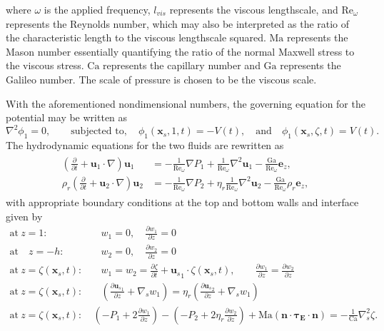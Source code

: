 \documentclass{jfm_arxiv}
\newcommand{\xs}{\mathbf{x}_s}
\newcommand{\us}{\mathbf{u}_s}
\newcommand{\vel}{\mathbf{u}}
\newcommand{\Ma}{\text{Ma}}
\newcommand{\Ca}{\text{Ca}}
\newcommand{\Ga}{\text{Ga}}
\renewcommand{\Re}{\text{Re}_\omega}
\begin{document}
where $\omega$ is the applied frequency, $l_{vis}$ represents the viscous lengthscale, and $\Re$ represents the Reynolds number, which may also be interpreted as the ratio of the characteristic length to the viscous lengthscale squared.
$\Ma$ represents the Mason number essentially quantifying the ratio of the normal Maxwell stress to the viscous stress.
$\Ca$ represents the capillary number and $\Ga$ represents the Galileo number.
The scale of pressure is chosen to be the viscous scale.

With the aforementioned nondimensional numbers, the governing equation for the potential may be written as
\begin{equation}
  \nabla^2\phi_1 = 0, \qquad \text{subjected to},\quad \phi_1(\xs,1,t) = -V(t),\quad \text{and} \quad \phi_1(\xs,\zeta,t) = V(t).
  \label{eq:pot_nd}
  \end{equation}
The hydrodynamic equations for the two fluids are rewritten as
\begin{eqnarray}
  \begin{aligned}
 \left( \frac{\partial }{\partial t} + \vel_1\cdot \nabla \right)\vel_1 &= -\frac{1}{\Re}\nabla P_1 + \frac{1}{\Re}\nabla^2 \vel_1 -\frac{\Ga}{\Re} {\mathbf{e}_z}, \\
 {\rho_r} \left( \frac{\partial }{\partial t} + \vel_2 \cdot \nabla \right)\vel_2 &= -\frac{1}{\Re}\nabla P_2 + \eta_r\frac{1}{\Re}\nabla^2 \vel_2 -\frac{\Ga}{\Re}\rho_r {\mathbf{e}_z},
  \end{aligned}
  \label{eq:hydro}
\end{eqnarray}
with appropriate boundary conditions at the top and bottom walls and interface given by
\begin{align}
  \text{at} \: z = 1: &\quad w_1 = 0, \quad \frac{\partial w_1}{\partial z} = 0
  \label{eq:noslip_top}
  \\
  \text{at} \quad z = -h: &\quad  w_2 = 0, \quad \frac{\partial w_2}{\partial z} = 0
  \label{eq:noslip_bot}
  \\
  \text{at} \: z = \zeta(\xs,t): &\quad  w_1 = w_2 = \frac{\partial \zeta}{\partial t} + {\us}_1\cdot \zeta(\xs,t), \qquad \frac{\partial w_1}{\partial z} = \frac{\partial w_2}{\partial z}
  \label{eq:dyn_bc}
  \\
\text{at} \: z = \zeta(\xs,t): &\quad \left(\frac{\partial {\us}_1}{\partial z} + \nabla_sw_1 \right)
  =\eta_r \left(\frac{\partial {\us}_2}{\partial z} + \nabla_sw_1 \right)
  \label{eq:tang_str}
  \\
  \text{at} \: z = \zeta(\xs,t): &\: \left(-P_1 + 2 \frac{\partial w_1}{\partial z}\right) - \left(-P_2 + 2\eta_r \frac{\partial w_2}{\partial z}\right) + \Ma\left({\mathbf{n}}\cdot{\mathbf{\tau_E}}\cdot{\mathbf{n}}\right) = -\frac{1}{\Ca}\nabla_s^2\zeta.
    \label{eq:mason}
\end{align}
\end{document}
